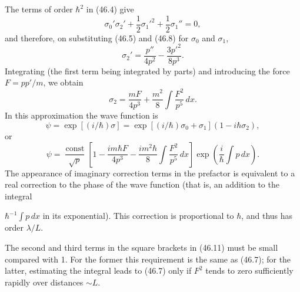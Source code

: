 The terms of order $\hbar^2$ in (46.4) give
\[
  \sigma_0'\sigma_2'+\frac12\sigma_1'^2+\frac12\sigma_1''=0,
\]
and therefore, on substituting (46.5) and (46.8) for $\sigma_0$ and
$\sigma_1$,
\[
  \sigma_2'=\frac{p''}{4p^2}-\frac{3p'^2}{8p^3}.
\]
Integrating (the first term being integrated by parts) and introducing the
force $F=pp'/m$, we obtain
\[
  \sigma_2=\frac{mF}{4p^3}+\frac{m^2}{8}\int\frac{F^2}{p^5}\,dx.
\]
In this approximation the wave function is
\[
  \psi=\exp[(i/\hbar)\sigma]
  =\exp[(i/\hbar)\sigma_0+\sigma_1](1-i\hbar\sigma_2),
\]
or
\begin{equation}
  \psi=\frac{\operatorname{const}}{\sqrt p}
  \left[1-\frac{im\hbar F}{4p^3}
  -\frac{im^2\hbar}{8}\int\frac{F^2}{p^5}\,dx\right]
  \exp\left(\frac i\hbar\int p\,dx\right).
  \tag{46.11}
\end{equation}
The appearance of imaginary correction terms in the prefactor is equivalent
to a real correction to the phase of the wave function (that is, an addition
to the integral

$\hbar^{-1}\int p\,dx$ in its exponential). This correction is proportional
to $\hbar$, and thus has order $\lambda/L$.

The second and third terms in the square brackets in (46.11) must be small
compared with 1. For the former this requirement is the same as (46.7); for
the latter, estimating the integral leads to (46.7) only if $F^2$ tends to
zero sufficiently rapidly over distances $\sim L$.
